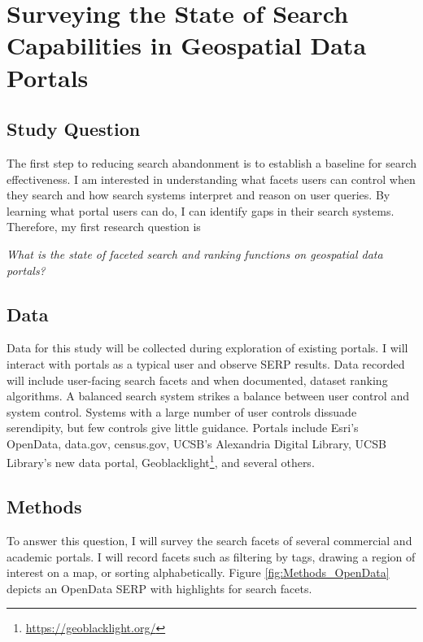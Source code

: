 \section{Surveying the State of Search Capabilities in Geospatial Data Portals}

\subsection{Study Question}
The first step to reducing search abandonment is to establish a baseline for search effectiveness. I am interested in understanding what facets users can control when they search and how search systems interpret and reason on user queries. By learning what portal users can do, I can identify gaps in their search systems. Therefore, my first research question is
\linebreak

\emph{What is the state of faceted search and ranking functions on geospatial data portals?}

\subsection{Data}
Data for this study will be collected during exploration of existing portals. I will interact with portals as a typical user and observe SERP results. Data recorded will include user-facing search facets and when documented, dataset ranking algorithms. A balanced search system strikes a balance between user control and system control. Systems with a large number of user controls dissuade serendipity, but few controls give little guidance. Portals include Esri's OpenData, data.gov, census.gov, UCSB's Alexandria Digital Library, UCSB Library's new data portal, Geoblacklight\footnote{\url{https://geoblacklight.org/}}, and several others.

\subsection{Methods}
To answer this question, I will survey the search facets of several commercial and academic portals. I will record facets such as filtering by tags, drawing a region of interest on a map, or sorting alphabetically. Figure \ref{fig:Methods_OpenData} depicts an OpenData SERP with highlights for search facets.

